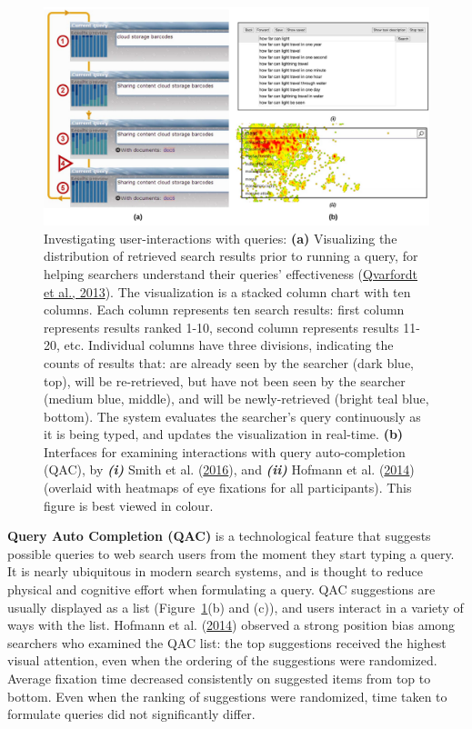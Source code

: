 \documentclass[letterpaper, nobind]{templates/ociamthesis}
\begin{document}
\begin{figure}

{\centering \includegraphics[width=1\linewidth]{figs/int-Q} 

}

\caption[Investigating user-interactions with queries.]{Investigating user-interactions with queries: \textbf{(a)} Visualizing the distribution of retrieved search results prior to running a query, for helping searchers understand their queries' effectiveness (\protect\hyperlink{ref-121}{Qvarfordt et al., 2013}). The visualization is a stacked column chart with ten columns. Each column represents ten search results: first column represents results ranked 1-10, second column represents results 11-20, etc. Individual columns have three divisions, indicating the counts of results that: are already seen by the searcher (dark blue, top), will be re-retrieved, but have not been seen by the searcher (medium blue, middle), and will be newly-retrieved (bright teal blue, bottom). The system evaluates the searcher's query continuously as it is being typed, and updates the visualization in real-time. \textbf{(b)} Interfaces for examining interactions with query auto-completion (QAC), by \textbf{\emph{(i)}} Smith et al. (\protect\hyperlink{ref-129}{2016}), and \textbf{\emph{(ii)}} Hofmann et al. (\protect\hyperlink{ref-125}{2014}) (overlaid with heatmaps of eye fixations for all participants). This figure is best viewed in colour.}\label{fig:int-Q}
\end{figure}





\textbf{Query Auto Completion (QAC)} is a technological feature that suggests
possible queries to web search users from the moment they start typing a
query. It is nearly ubiquitous in modern search systems, and is thought
to reduce physical and cognitive effort when formulating a query. QAC
suggestions are usually displayed as a list
(Figure~\ref{fig:int-Q}(b)
and (c)), and users interact in a variety of ways with the list. Hofmann et al. (\protect\hyperlink{ref-125}{2014})
observed a strong position bias among searchers who examined the QAC
list: the top suggestions received the highest visual attention, even
when the ordering of the suggestions were randomized. Average fixation
time decreased consistently on suggested items from top to bottom. Even
when the ranking of suggestions were randomized, time taken to formulate
queries did not significantly differ.
\end{document}
